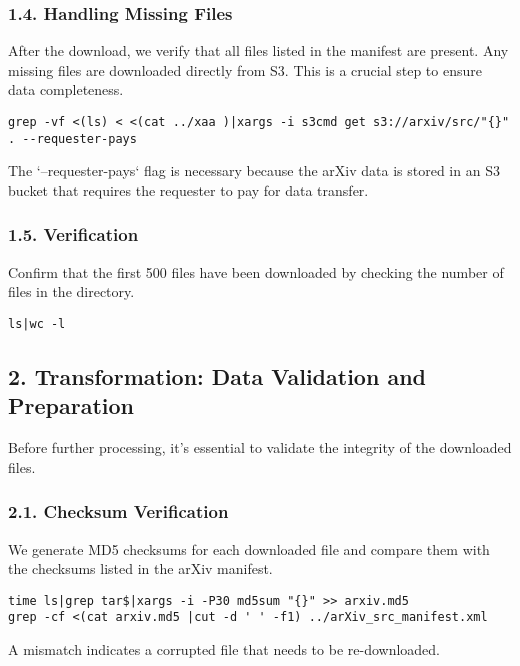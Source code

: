 \documentclass{article}
\begin{document}
\subsubsection{1.4. Handling Missing Files}

After the download, we verify that all files listed in the manifest are present. Any missing files are downloaded directly from S3.  This is a crucial step to ensure data completeness.

\begin{lstlisting}
grep -vf <(ls) < <(cat ../xaa )|xargs -i s3cmd get s3://arxiv/src/"{}" . --requester-pays
\end{lstlisting}

The `--requester-pays` flag is necessary because the arXiv data is stored in an S3 bucket that requires the requester to pay for data transfer.

\subsubsection{1.5. Verification}

Confirm that the first 500 files have been downloaded by checking the number of files in the directory.

\begin{lstlisting}
ls|wc -l
\end{lstlisting}

\subsection{2. Transformation: Data Validation and Preparation}

Before further processing, it's essential to validate the integrity of the downloaded files.

\subsubsection{2.1. Checksum Verification}

We generate MD5 checksums for each downloaded file and compare them with the checksums listed in the arXiv manifest.

\begin{lstlisting}
time ls|grep tar$|xargs -i -P30 md5sum "{}" >> arxiv.md5
grep -cf <(cat arxiv.md5 |cut -d ' ' -f1) ../arXiv_src_manifest.xml 
\end{lstlisting}

A mismatch indicates a corrupted file that needs to be re-downloaded.
\end{document}
